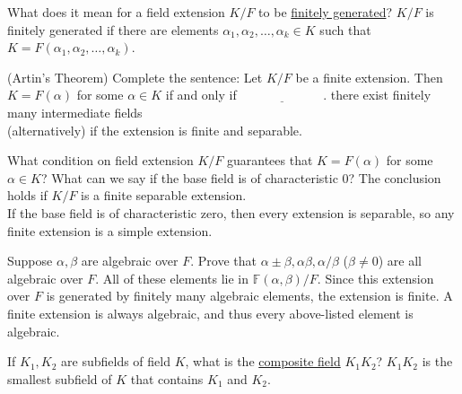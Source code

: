 \documentclass[avery5371,grid]{flashcards}
\newcommand{\F}{\mathbb{F}}
\newcommand{\blank}{$\; \underline{\hspace{1in}} \; $}
\begin{document}
\begin{flashcard}[Fields]{What does it mean for a field extension $K/F$ to be \underline{finitely generated}?}
 $K/F$ is finitely generated if there are elements $\alpha_1, \alpha_2, \ldots, \alpha_k \in K$ such that $K=F(\alpha_1, \alpha_2, \ldots, \alpha_k)$.
\end{flashcard}

\begin{flashcard}[Fields]{(Artin's Theorem) Complete the sentence: Let $K/F$ be a finite extension. Then $K = F(\alpha)$ for some $\alpha \in K$ if and only if \blank.}
 there exist finitely many intermediate fields \\
 
 (alternatively) if the extension is finite and separable.
\end{flashcard}

\begin{flashcard}[Fields]{What condition on field extension $K/F$ guarantees that $K = F(\alpha)$ for some $\alpha \in K$? What can we say if the base field is of characteristic 0?}
 The conclusion holds if $K/F$ is a finite separable extension.\\
 
 If the base field is of characteristic zero, then every extension is separable, so any finite extension is a simple extension.
\end{flashcard}

\begin{flashcard}[Fields]{Suppose $\alpha, \beta$ are algebraic over $F$. Prove that $\alpha \pm \beta, \alpha \beta, \alpha/ \beta$ ($\beta \neq 0$) are all algebraic over $F$.}
 All of these elements lie in $\F(\alpha, \beta)/F$. Since this extension over $F$ is generated by finitely  many algebraic elements, the extension is finite. A finite extension is always algebraic, and thus every above-listed element is algebraic.
\end{flashcard}

\begin{flashcard}[Fields]{If $K_1, K_2$ are subfields of field $K$, what is the \underline{composite field} $K_1K_2$?}
 $K_1 K_2$ is the smallest subfield of $K$ that contains $K_1$ and $K_2$.
\end{flashcard}
\end{document}
